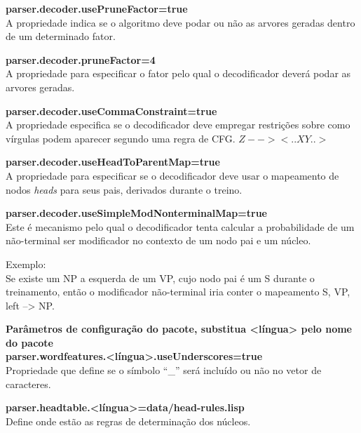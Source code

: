 \textbf{parser.decoder.usePruneFactor=true}\\
A propriedade indica se o algoritmo deve podar ou não as arvores geradas dentro de um determinado fator.

\textbf{parser.decoder.pruneFactor=4}\\
A propriedade para especificar o fator pelo qual o decodificador deverá podar as arvores geradas. 

\textbf{parser.decoder.useCommaConstraint=true}\\
A propriedade  especifica se o decodificador deve empregar restrições sobre como vírgulas podem aparecer segundo uma regra de CFG.
$Z --> <.. X Y..>$

\textbf{parser.decoder.useHeadToParentMap=true}\\
A propriedade para especificar se o decodificador deve usar o mapeamento de nodos \emph{heads} para seus pais, derivados durante o treino.

\textbf{parser.decoder.useSimpleModNonterminalMap=true}\\
Este é mecanismo pelo qual o decodificador tenta calcular a probabilidade de um não-terminal ser modificador no contexto de um nodo pai e um núcleo.

Exemplo:\\
Se existe um NP a esquerda de um VP, cujo nodo pai é um S durante o treinamento, então o modificador não-terminal iria conter o mapeamento S, VP, left --> NP.

\textbf{Parâmetros de configuração do pacote, substitua <língua> pelo nome do pacote}\\
\textbf{parser.wordfeatures.<língua>.useUnderscores=true}\\
Propriedade que define se o símbolo ``\_'' será incluído ou não no vetor de caracteres.

\textbf{parser.headtable.<língua>=data/head-rules.lisp}\\
Define onde estão as regras de determinação dos núcleos.

\HRule \\





